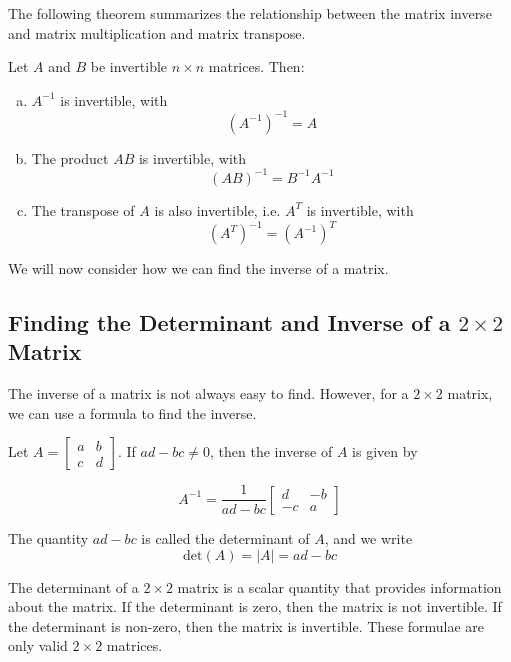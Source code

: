 The following theorem summarizes the relationship between the matrix inverse and matrix multiplication and matrix transpose.

\begin{theorem} Let $A$ and $B$ be invertible $n \times n$ matrices. Then:
\begin{enumerate}[(a)]
    \item $A^{-1}$ is invertible, with
    \[
    \left(A^{-1}\right)^{-1}=A
    \]
    \item The product $A B$ is invertible, with
    \[
    (A B)^{-1}=B^{-1} A^{-1}
    \]
    \item The transpose of $A$ is also invertible, i.e. $A^T$ is invertible, with
    \[
    \left(A^T\right)^{-1}=\left(A^{-1}\right)^T
    \]
\end{enumerate}

\end{theorem}

We will now consider how we can find the inverse of a matrix.

\subsection*{Finding the Determinant and Inverse of a $2 \times 2$ Matrix}

The inverse of a matrix is not always easy to find. However, for a $2 \times 2$ matrix, we can use a formula to find the inverse.

\begin{theorem}
    Let $A=\left[\begin{array}{ll}
    a & b \\
    c & d
    \end{array}\right]$. If $ad-bc \neq 0$, then the inverse of $A$ is given by

    \[
    A^{-1}=\frac{1}{ad-bc}\left[\begin{array}{cc}
    d & -b \\
    -c & a
    \end{array}\right]
    \]
\end{theorem}

\begin{remark}
    The quantity $ad - bc$ is called the determinant of $A$, and we write
    \[
    \text{det}(A) = |A| = ad - bc
    \]
\end{remark}

The determinant of a $2 \times 2$ matrix is a scalar quantity that provides information about the matrix. If the determinant is zero, then the matrix is not invertible. If the determinant is non-zero, then the matrix is invertible. These formulae are only valid $2 \times 2$ matrices.

